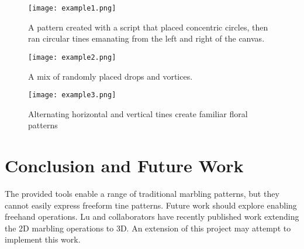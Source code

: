 \documentclass{article}
\begin{document}
\begin{figure}
    \texttt{[image: example1.png]}
    \caption{A pattern created with a script that placed concentric circles, then ran circular tines emanating from the left and right of the canvas.}
\end{figure}

\begin{figure}
    \texttt{[image: example2.png]}
    \caption{A mix of randomly placed drops and vortices.}
\end{figure}

\begin{figure}
    \texttt{[image: example3.png]}
    \caption{Alternating horizontal and vertical tines create familiar floral patterns}
\end{figure}

\section{Conclusion and Future Work}

The provided tools enable a range of traditional marbling patterns, but they cannot easily express freeform tine patterns. Future work should explore enabling freehand operations. Lu and collaborators have recently published work extending the 2D marbling operations to 3D. An extension of this project may attempt to implement this work. 



\end{document}
